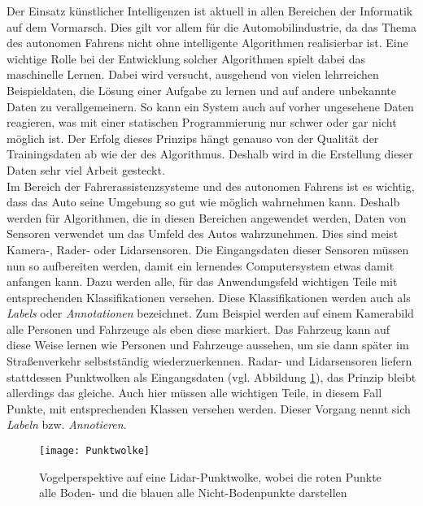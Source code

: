 \graphicspath{{Kapitel/Kapitel1_Einleitung/Images/}}

Der Einsatz künstlicher Intelligenzen ist aktuell in allen Bereichen der Informatik auf dem Vormarsch. Dies gilt vor allem für die Automobilindustrie, da das Thema des autonomen Fahrens nicht ohne intelligente Algorithmen realisierbar ist. Eine wichtige Rolle bei der Entwicklung solcher Algorithmen spielt dabei das maschinelle Lernen. Dabei wird versucht, ausgehend von vielen lehrreichen Beispieldaten, die Lösung einer Aufgabe zu lernen und auf andere unbekannte Daten zu verallgemeinern. So kann ein System auch auf vorher ungesehene Daten reagieren, was mit einer statischen Programmierung nur schwer oder gar nicht möglich ist. Der Erfolg dieses Prinzips hängt genauso von der Qualität der Trainingsdaten ab wie der des Algorithmus. Deshalb wird in die Erstellung dieser Daten sehr viel Arbeit gesteckt.\\

Im Bereich der Fahrerassistenzsysteme und des autonomen Fahrens ist es wichtig, dass das Auto seine Umgebung so gut wie möglich wahrnehmen kann. Deshalb werden für Algorithmen, die in diesen Bereichen angewendet werden, Daten von Sensoren verwendet um das Umfeld des Autos wahrzunehmen. Dies sind meist Kamera-, Rader- oder Lidarsensoren. Die Eingangsdaten dieser Sensoren müssen nun so aufbereiten werden, damit ein lernendes Computersystem etwas damit anfangen kann. Dazu werden alle, für das Anwendungsfeld wichtigen Teile mit entsprechenden Klassifikationen versehen. Diese Klassifikationen werden auch als \textit{Labels} oder \textit{Annotationen} bezeichnet. Zum Beispiel werden auf einem Kamerabild alle Personen und Fahrzeuge als eben diese markiert. Das Fahrzeug kann auf diese Weise lernen wie Personen und Fahrzeuge aussehen, um sie dann später im Straßenverkehr selbstständig wiederzuerkennen. Radar- und Lidarsensoren liefern stattdessen Punktwolken als Eingangsdaten (vgl. Abbildung \ref{fig:Punktwolke}), das Prinzip bleibt allerdings das gleiche. Auch hier müssen alle wichtigen Teile, in diesem Fall Punkte, mit entsprechenden Klassen versehen werden. Dieser Vorgang nennt sich \textit{Labeln} bzw. \textit{Annotieren}.\\

\begin{figure}%
    \texttt{[image: Punktwolke]}
    \caption{Vogelperspektive auf eine Lidar-Punktwolke, wobei die roten Punkte alle Boden- und die blauen alle Nicht-Bodenpunkte darstellen \cite{bib:FastGroundSeg}}
	\label{fig:Punktwolke}
\end{figure}


